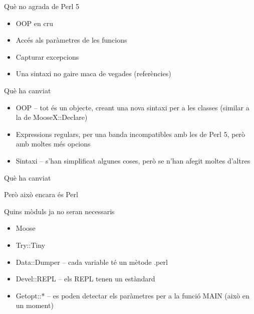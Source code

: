 \documentclass{beamer}
\begin{document}
\begin{frame}{Què no agrada de Perl 5}
	\begin{itemize}
		\item OOP en cru
		\item Accés als paràmetres de les funcions
		\item Capturar excepcions
		\item Una sintaxi no gaire maca de vegades (referències)
	\end{itemize}
\end{frame}

\begin{frame}{Què ha canviat}
	\begin{itemize}
		\item OOP -- tot és un objecte, creant una nova sintaxi
			per a les classes (similar a la de MooseX::Declare)
		\item Expressions regulars, per una banda incompatibles
            amb les de Perl 5, però amb moltes més opcions
		\item Sintaxi -- s'han simplificat algunes coses,
			però se n'han afegit moltes d'altres
	\end{itemize}
\end{frame}

\begin{frame}[fragile]{Què ha canviat}
	\begin{center}
		{\Huge Però això encara és Perl}
	\end{center}
\end{frame}

\begin{frame}[fragile]{Quins mòduls ja no seran necessaris}
	\begin{itemize}
		\item Moose
		\item Try::Tiny
		\item Data::Dumper -- cada variable té un mètode .perl
		\item Devel::REPL -- els REPL tenen un estàndard
		\item Getopt::* -- es poden detectar els paràmetres per a
            la funció MAIN (això en un moment) %
	\end{itemize}
\end{frame}
\end{document}
